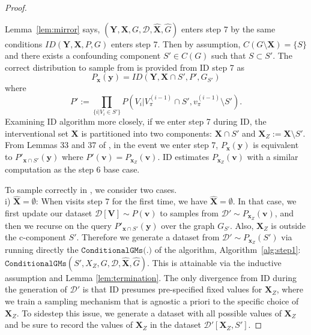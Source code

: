 \documentclass{article}
\newcommand{\x}{\mathbf{x}}
\newcommand{\y}{\mathbf{y}}
\newcommand{\X}{\mathbf{X}}
\newcommand{\Xp}{{\hat{\mathbf{X}}}}
\newcommand{\xp}{{\hat{\mathbf{x}}}}
\newcommand{\Gp}{{\hat{{G}}}}
\newcommand{\Y}{\mathbf{Y}}
\newcommand{\V}{\mathbf{V}}
\newcommand{\vb}{\mathbf{v}}
\newcommand{\data}{\mathcal{D}}
\newcommand{\idgen}{\text{ID-GEN}\xspace}
\newcommand{\condgm}{\texttt{ConditionalGMs(.)}\xspace}
\newcommand{\idgenpar}{\idgen$(\mathbf{Y}, \mathbf{X},  G,  \data, {\Xp}, \Gp)$\xspace}
\theoremstyle{plain}
\theoremstyle{definition}
\theoremstyle{remark}
\begin{document}
\begin{proof}
	\begin{figure}[omitted: a diagram of this paper's results, not reproduced here]\end{figure}
  
		
		Lemma~\ref{lem:mirror} says, \idgenpar enters step 7 by the same conditions $ID(\Y,\X, P, G)$ enters step 7. Then by assumption, $C(G\setminus \X)=\{S\}$ and there exists a confounding component $S'\in C(G)$ such that $S\subset S'$. The correct distribution to sample from is provided from ID step 7 as 
		\[
		P_{\x}(\y) = ID(\Y, \X\cap S', P', G_{S'})
		\]
		where 
		\[P' := \prod_{\{i|V_i\in S'\}} P(V_i| V_\pi^{(i-1)}\cap S', v_\pi^{(i-1)}\setminus S').\]
		Examining ID algorithm more closely, if we enter step 7 during ID, the interventional set $\X$ is partitioned into two components: $\X\cap S'$ and $\X_Z:=\X\setminus S'$. From Lemmas 33 and 37 of \citet{shpitser2008complete}, in the event we enter step 7, $P_{\x}(\y)$ is equivalent to $P'_{\x \cap S'}(\y)$ where $P'(\vb)=P_{\x_Z}(\vb)$. 
		ID estimates $P_{\x_Z}(\vb)$ with a similar computation as the step 6 base case.

  
 To sample correctly in \idgen, we consider two cases.\\
 i) $\Xp=\emptyset$: When \idgen visits step 7 for the first time, we have $\Xp=\emptyset$. In that case,  we first update our dataset $\data[\V]\sim P(\vb)$ to samples from $\data'\sim P_{\x_Z}( \vb)$, and then we recurse on the query $P'_{\x\cap S'}(\y)$ over the graph $G_{S'}$.
Also, $\X_Z$ is outside the c-component $S'$. Therefore we generate a dataset from $\data'\sim P_{\x_Z}(S')$ via running directly the $\condgm$ of the \idgen algorithm, Algorithm~\ref{alg:step1}: 
$\texttt{ConditionalGMs}(S', X_Z, G, \data, \Xp, \Gp)$. This is attainable via the inductive assumption and Lemma \ref{lem:termination}. The only divergence from ID during the generation of $\data'$ is that ID presumes pre-specified fixed values for $\X_Z$, where we train a sampling mechanism that is agnostic a priori to the specific choice of $\X_Z$. To sidestep this issue, we generate a dataset with all possible values of $\X_Z$ and be sure to record the values of $\X_Z$ in the dataset $\data'[\X_Z, S']$. 


\end{proof}
\end{document}
